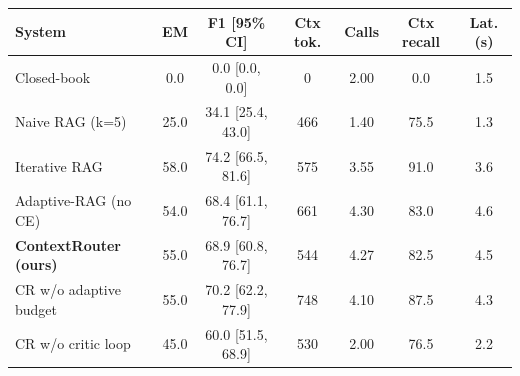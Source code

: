 \begin{tabular}{lcccccc}
\hline
System & EM & F1 [95\% CI] & Ctx tok. & Calls & Ctx recall & Lat. (s) \\
\hline
Closed-book & 0.0 & 0.0 [0.0, 0.0] & 0 & 2.00 & 0.0 & 1.5 \\
Naive RAG (k=5) & 25.0 & 34.1 [25.4, 43.0] & 466 & 1.40 & 75.5 & 1.3 \\
Iterative RAG & 58.0 & 74.2 [66.5, 81.6] & 575 & 3.55 & 91.0 & 3.6 \\
Adaptive-RAG (no CE) & 54.0 & 68.4 [61.1, 76.7] & 661 & 4.30 & 83.0 & 4.6 \\
\textbf{ContextRouter (ours)} & 55.0 & 68.9 [60.8, 76.7] & 544 & 4.27 & 82.5 & 4.5 \\
CR w/o adaptive budget & 55.0 & 70.2 [62.2, 77.9] & 748 & 4.10 & 87.5 & 4.3 \\
CR w/o critic loop & 45.0 & 60.0 [51.5, 68.9] & 530 & 2.00 & 76.5 & 2.2 \\
\hline
\end{tabular}
